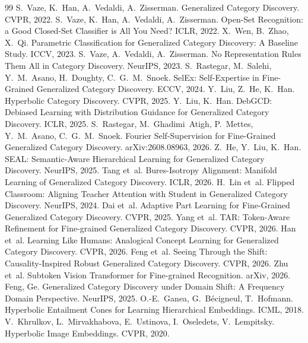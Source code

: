 \documentclass[10pt]{article}
\begin{document}
\begin{thebibliography}{99}\small
{} S.~Vaze, K.~Han, A.~Vedaldi, A.~Zisserman. Generalized Category Discovery. CVPR, 2022.
 S.~Vaze, K.~Han, A.~Vedaldi, A.~Zisserman. Open-Set Recognition: a Good Closed-Set Classifier is All You Need? ICLR, 2022.
 X.~Wen, B.~Zhao, X.~Qi. Parametric Classification for Generalized Category Discovery: A Baseline Study. ICCV, 2023.
 S.~Vaze, A.~Vedaldi, A.~Zisserman. No Representation Rules Them All in Category Discovery. NeurIPS, 2023.
 S.~Rastegar, M.~Salehi, Y.~M.~Asano, H.~Doughty, C.~G.~M.~Snoek. SelEx: Self-Expertise in Fine-Grained Generalized Category Discovery. ECCV, 2024.
 Y.~Liu, Z.~He, K.~Han. Hyperbolic Category Discovery. CVPR, 2025.
 Y.~Liu, K.~Han. DebGCD: Debiased Learning with Distribution Guidance for Generalized Category Discovery. ICLR, 2025.
 S.~Rastegar, M.~Ghadimi~Atigh, P.~Mettes, Y.~M.~Asano, C.~G.~M.~Snoek. Fourier Self-Supervision for Fine-Grained Generalized Category Discovery. arXiv:2608.08963, 2026.
 Z.~He, Y.~Liu, K.~Han. SEAL: Semantic-Aware Hierarchical Learning for Generalized Category Discovery. NeurIPS, 2025.
 Tang et~al. Bures-Isotropy Alignment: Manifold Learning of Generalized Category Discovery. ICLR, 2026.
 H.~Lin et~al. Flipped Classroom: Aligning Teacher Attention with Student in Generalized Category Discovery. NeurIPS, 2024.
 Dai et~al. Adaptive Part Learning for Fine-Grained Generalized Category Discovery. CVPR, 2025.
 Yang et~al. TAR: Token-Aware Refinement for Fine-grained Generalized Category Discovery. CVPR, 2026.
 Han et~al. Learning Like Humans: Analogical Concept Learning for Generalized Category Discovery. CVPR, 2026.
 Feng et~al. Seeing Through the Shift: Causality-Inspired Robust Generalized Category Discovery. CVPR, 2026.
 Zhu et~al. Subtoken Vision Transformer for Fine-grained Recognition. arXiv, 2026.
 Feng, Ge. Generalized Category Discovery under Domain Shift: A Frequency Domain Perspective. NeurIPS, 2025.
 O.-E.~Ganea, G.~B\'ecigneul, T.~Hofmann. Hyperbolic Entailment Cones for Learning Hierarchical Embeddings. ICML, 2018.
 V.~Khrulkov, L.~Mirvakhabova, E.~Ustinova, I.~Oseledets, V.~Lempitsky. Hyperbolic Image Embeddings. CVPR, 2020.

\end{thebibliography}
\end{document}
